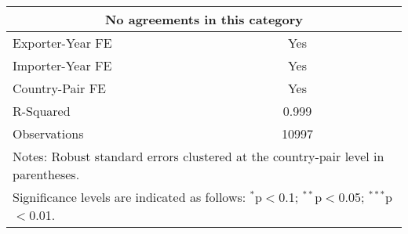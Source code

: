 \begin{table}[htbp]
\begin{adjustbox}{max width=\textwidth}
\begin{tabular}{lccc}
    \hline
    \multicolumn{4}{c}{No agreements in this category} \\
    \hline
    Exporter-Year FE & Yes \\
    Importer-Year FE & Yes \\
    Country-Pair FE & Yes \\
    R-Squared & 0.999 \\
    Observations & 10997 \\
    \hline
    \multicolumn{4}{l}{\footnotesize{Notes: Robust standard errors clustered at the country-pair level in parentheses.}} \\
    \multicolumn{4}{l}{\footnotesize{Significance levels are indicated as follows: $^{\ast}$p$<$0.1; $^{\ast\ast}$p$<$0.05; $^{\ast\ast\ast}$p$<$0.01.}} \\
    \end{tabular}
    \end{adjustbox}
\end{table}
